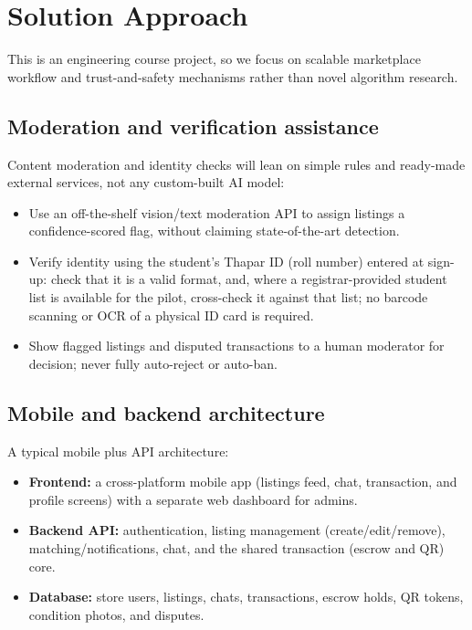 \documentclass[11pt]{article}
\begin{document}
\section{Solution Approach}
This is an engineering course project, so we focus on scalable marketplace workflow and trust-and-safety mechanisms rather than novel algorithm research.

\subsection{Moderation and verification assistance}
Content moderation and identity checks will lean on simple rules and ready-made external services, not any custom-built AI model:
\begin{itemize}[leftmargin=*]
\item Use an off-the-shelf vision/text moderation API to assign listings a confidence-scored flag, without claiming state-of-the-art detection.
\item Verify identity using the student's Thapar ID (roll number) entered at sign-up: check that it is a valid format, and, where a registrar-provided student list is available for the pilot, cross-check it against that list; no barcode scanning or OCR of a physical ID card is required.
\item Show flagged listings and disputed transactions to a human moderator for decision; never fully auto-reject or auto-ban.
\end{itemize}

\subsection{Mobile and backend architecture}
A typical mobile plus API architecture:
\begin{itemize}[leftmargin=*]
\item \textbf{Frontend:} a cross-platform mobile app (listings feed, chat, transaction, and profile screens) with a separate web dashboard for admins.
\item \textbf{Backend API:} authentication, listing management (create/edit/remove), matching/notifications, chat, and the shared transaction (escrow and QR) core.
\item \textbf{Database:} store users, listings, chats, transactions, escrow holds, QR tokens, condition photos, and disputes.
\end{itemize}
\end{document}
